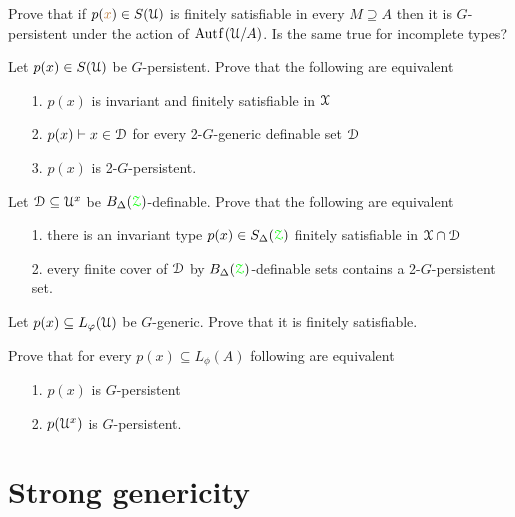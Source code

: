 \begin{exercise}
  Prove that if $p({\color{brown} x})\in S(\EuScript U)$ is finitely satisfiable in every $M\supseteq A$ then it is $G$-persistent under the action of $\mathord{\rm Aut\kern.15ex{f}\kern.15ex}(\EuScript U/A)$.
  Is the same true for incomplete types?
\end{exercise}

\begin{exercise}
  Let $p(x)\in S(\EuScript U)$ be $G$-persistent.
  Prove that the following are equivalent
  \begin{itemize}
    \item[1.] $p(x)$ is invariant and finitely satisfiable in $\EuScript X$
    \item[2.] $p(x)\vdash x\in\EuScript D$ for every 2-$G$-generic definable set $\EuScript D$
    \item[3.] $p(x)$ is 2-$G$-persistent.
  \end{itemize}
\end{exercise}

\begin{exercise}
  Let $\EuScript D\subseteq\EuScript U^x$ be $B_\Delta({{\color{green}\EuScript Z}})$-definable.
  Prove that the following are equivalent 
  \begin{itemize}
    \item[1.] there is an invariant type $p(x)\in S_\Delta({\color{green}\EuScript Z})$ finitely satisfiable in $\EuScript X\cap\EuScript D$
    \item[2.] every finite cover of $\EuScript D$ by $B_\Delta({{\color{green}\EuScript Z}})$-definable sets contains a 2-$G$-persistent set.
  \end{itemize}
\end{exercise}

\begin{exercise}\label{ex_gen_sat}
  Let $p(x)\subseteq L_\varphi(\EuScript U)$ be $G$-generic.
  Prove that it is finitely satisfiable.
\end{exercise}

\begin{exercise}\label{ex_persistent_types}
  Prove that for every $p(x)\subseteq L_\phi(A)$ following are equivalent
  \begin{itemize}
    \item[1.] $p(x)$ is $G$-persistent
    \item[2.] $p(\EuScript U^x)$ is $G$-persistent.
  \end{itemize}
\end{exercise}

\section{Strong genericity}\label{strong_genericity}\label{strong_genericity}


